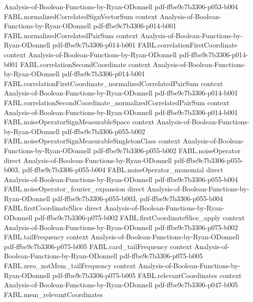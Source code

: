 \begin{theorem}
  {Analysis-of-Boolean-Functions-by-Ryan-ODonnell}
  {pdf-ffbe9c7b3306-p053-b004}
\proofstep
  {FABL.normalizedCorrelatedSignVectorSum}
  {context}
  {Analysis-of-Boolean-Functions-by-Ryan-ODonnell}
  {pdf-ffbe9c7b3306-p014-b001}
\proofstep
  {FABL.normalizedCorrelatedPairSum}
  {context}
  {Analysis-of-Boolean-Functions-by-Ryan-ODonnell}
  {pdf-ffbe9c7b3306-p014-b001}
\proofstep
  {FABL.correlationFirstCoordinate}
  {context}
  {Analysis-of-Boolean-Functions-by-Ryan-ODonnell}
  {pdf-ffbe9c7b3306-p014-b001}
\proofstep
  {FABL.correlationSecondCoordinate}
  {context}
  {Analysis-of-Boolean-Functions-by-Ryan-ODonnell}
  {pdf-ffbe9c7b3306-p014-b001}
\proofstep
  {FABL.correlationFirstCoordinate_normalizedCorrelatedPairSum}
  {context}
  {Analysis-of-Boolean-Functions-by-Ryan-ODonnell}
  {pdf-ffbe9c7b3306-p014-b001}
\proofstep
  {FABL.correlationSecondCoordinate_normalizedCorrelatedPairSum}
  {context}
  {Analysis-of-Boolean-Functions-by-Ryan-ODonnell}
  {pdf-ffbe9c7b3306-p014-b001}
\proofstep
  {FABL.noiseOperatorSignMeasurableSpace}
  {context}
  {Analysis-of-Boolean-Functions-by-Ryan-ODonnell}
  {pdf-ffbe9c7b3306-p055-b002}
\proofstep
  {FABL.noiseOperatorSignMeasurableSingletonClass}
  {context}
  {Analysis-of-Boolean-Functions-by-Ryan-ODonnell}
  {pdf-ffbe9c7b3306-p055-b002}
\proofstep
  {FABL.noiseOperator}
  {direct}
  {Analysis-of-Boolean-Functions-by-Ryan-ODonnell}
  {pdf-ffbe9c7b3306-p055-b003,
    pdf-ffbe9c7b3306-p055-b004}
\proofstep
  {FABL.noiseOperator_monomial}
  {direct}
  {Analysis-of-Boolean-Functions-by-Ryan-ODonnell}
  {pdf-ffbe9c7b3306-p055-b004}
\proofstep
  {FABL.noiseOperator_fourier_expansion}
  {direct}
  {Analysis-of-Boolean-Functions-by-Ryan-ODonnell}
  {pdf-ffbe9c7b3306-p055-b003,
    pdf-ffbe9c7b3306-p055-b004}
\proofstep
  {FABL.firstCoordinateSlice}
  {direct}
  {Analysis-of-Boolean-Functions-by-Ryan-ODonnell}
  {pdf-ffbe9c7b3306-p075-b002}
\proofstep
  {FABL.firstCoordinateSlice_apply}
  {context}
  {Analysis-of-Boolean-Functions-by-Ryan-ODonnell}
  {pdf-ffbe9c7b3306-p075-b002}
\proofstep
  {FABL.tailFrequency}
  {context}
  {Analysis-of-Boolean-Functions-by-Ryan-ODonnell}
  {pdf-ffbe9c7b3306-p075-b005}
\proofstep
  {FABL.card_tailFrequency}
  {context}
  {Analysis-of-Boolean-Functions-by-Ryan-ODonnell}
  {pdf-ffbe9c7b3306-p075-b005}
\proofstep
  {FABL.zero_notMem_tailFrequency}
  {context}
  {Analysis-of-Boolean-Functions-by-Ryan-ODonnell}
  {pdf-ffbe9c7b3306-p075-b005}
\proofstep
  {FABL.relevantCoordinates}
  {context}
  {Analysis-of-Boolean-Functions-by-Ryan-ODonnell}
  {pdf-ffbe9c7b3306-p047-b005}
\proofstep
  {FABL.mem_relevantCoordinates}

\end{theorem}

